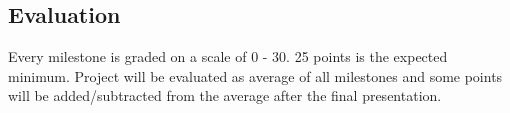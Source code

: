 \subsection*{Evaluation} %
\label{sub:Evaluation}
Every milestone is graded on a scale of 0 - 30.
25 points is the expected minimum.
Project will be evaluated as average of all milestones
and some points will be added/subtracted from the average after the final presentation.
